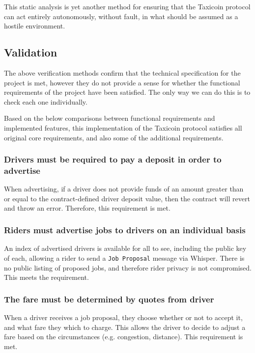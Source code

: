 This static analysis is yet another method for ensuring that the Taxicoin protocol can act entirely autonomously, without fault, in what should be assumed as a hostile environment.

\subsection{Validation}


The above verification methods confirm that the technical specification for the project is met, however they do not provide a sense for whether the functional requirements of the project have been satisfied. The only way we can do this is to check each one individually.

Based on the below comparisons between functional requirements and implemented features, this implementation of the Taxicoin protocol satisfies all original core requirements, and also some of the additional requirements.

\subsubsection*{Drivers must be required to pay a deposit in order to advertise}

When advertising, if a driver does not provide funds of an amount greater than or equal to the contract-defined driver deposit value, then the contract will revert and throw an error. Therefore, this requirement is met.

\subsubsection*{Riders must advertise jobs to drivers on an individual basis}

An index of advertised drivers is available for all to see, including the public key of each, allowing a rider to send a \lstinline{Job Proposal} message via Whisper. There is no public listing of proposed jobs, and therefore rider privacy is not compromised. This meets the requirement.

\subsubsection*{The fare must be determined by quotes from driver}

When a driver receives a job proposal, they choose whether or not to accept it, and what fare they which to charge. This allows the driver to decide to adjust a fare based on the circumstances (e.g. congestion, distance). This requirement is met.

